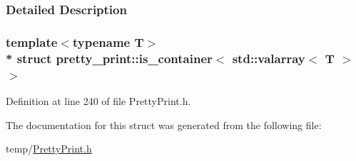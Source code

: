 \subsubsection{Detailed Description}
\subsubsection*{template$<$typename T$>$\\*
struct pretty\+\_\+print\+::is\+\_\+container$<$ std\+::valarray$<$ T $>$ $>$}



Definition at line 240 of file Pretty\+Print.\+h.



The documentation for this struct was generated from the following file\+:\begin{DoxyCompactItemize}
\item 
temp/\hyperlink{PrettyPrint_8h}{Pretty\+Print.\+h}\end{DoxyCompactItemize}
